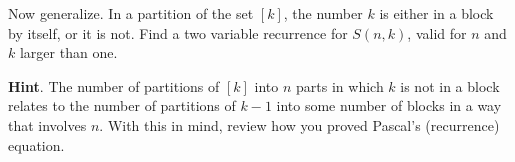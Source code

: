 \documentclass{book}
\begin{document}
\setcounter{cpjt}{200}
\addtocounter{cpjt}{-1}
\begin{activity}\label{secondstirlingrecurrence}
\hypertarget{p-1088}{}%
Now generalize.  In a partition of the set \([k]\), the number \(k\) is either in a block by itself, or it is not.  Find a two variable recurrence for \(S(n,k)\), valid for \(n\) and \(k\) larger than one.%
\par\smallskip%
\noindent\textbf{Hint}.\hypertarget{hint-126}{}\quad%
\hypertarget{p-1089}{}%
The number of partitions of \([k]\) into \(n\) parts in which \(k\) is not in a block relates to the number of partitions of \(k-1\) into some number of blocks in a way that involves \(n\). With this in mind, review how you proved Pascal's (recurrence) equation.%
\par\smallskip%
\noindent\end{activity}

\clearpage
\end{document}
